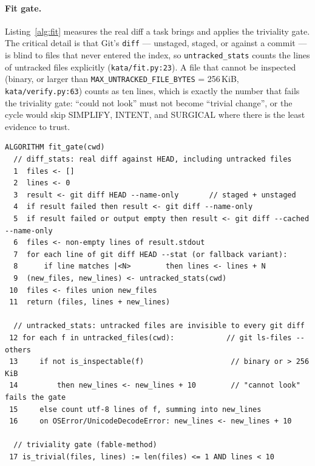 \documentclass{sbc2019}%
\begin{document}
\paragraph{Fit gate.} Listing~\ref{alg:fit} measures the real diff a task
brings and applies the triviality gate. The critical detail is that Git's
\texttt{diff} --- unstaged, staged, or against a commit --- is blind to
files that never entered the index, so \texttt{untracked\_stats} counts the
lines of untracked files explicitly (\texttt{kata/fit.py:23}). A file that
cannot be inspected (binary, or larger than
\texttt{MAX\_UNTRACKED\_FILE\_BYTES} = 256\,KiB, \texttt{kata/verify.py:63})
counts as ten lines, which is exactly the number that fails the triviality
gate: ``could not look'' must not become ``trivial change'', or the cycle
would skip SIMPLIFY, INTENT, and SURGICAL where there is the
least evidence to trust.

\begin{lstlisting}[caption=fit gate (kata/fit.py).,label=alg:fit]
ALGORITHM fit_gate(cwd)
  // diff_stats: real diff against HEAD, including untracked files
  1  files <- []
  2  lines <- 0
  3  result <- git diff HEAD --name-only       // staged + unstaged
  4  if result failed then result <- git diff --name-only
  5  if result failed or output empty then result <- git diff --cached --name-only
  6  files <- non-empty lines of result.stdout
  7  for each line of git diff HEAD --stat (or fallback variant):
  8      if line matches |<N>        then lines <- lines + N
  9  (new_files, new_lines) <- untracked_stats(cwd)
 10  files <- files union new_files
 11  return (files, lines + new_lines)

  // untracked_stats: untracked files are invisible to every git diff
 12 for each f in untracked_files(cwd):            // git ls-files --others
 13     if not is_inspectable(f)                    // binary or > 256 KiB
 14         then new_lines <- new_lines + 10        // "cannot look" fails the gate
 15     else count utf-8 lines of f, summing into new_lines
 16     on OSError/UnicodeDecodeError: new_lines <- new_lines + 10

  // triviality gate (fable-method)
 17 is_trivial(files, lines) := len(files) <= 1 AND lines < 10
\end{lstlisting}
\end{document}
